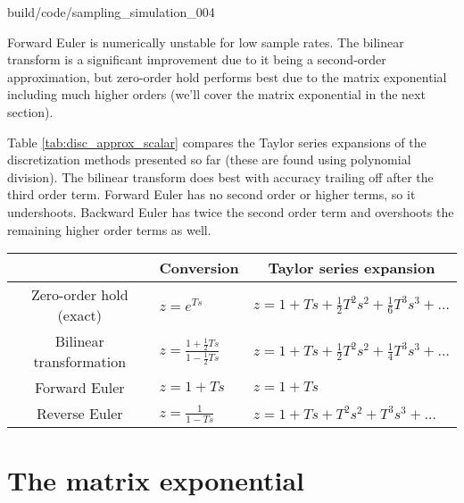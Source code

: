 \begin{svg}{build/code/sampling_simulation_004}
  \caption{Sampling methods for system simulation with $T = 0.04s$}
  \label{fig:sampling_simulation_0.04}
\end{svg}

Forward Euler is numerically unstable for low sample rates. The bilinear
transform is a significant improvement due to it being a second-order
approximation, but zero-order hold performs best due to the matrix exponential
including much higher orders (we'll cover the matrix exponential in the next
section).

Table \ref{tab:disc_approx_scalar} compares the Taylor series expansions of the
discretization methods presented so far (these are found using polynomial
division). The bilinear transform does best with accuracy trailing off after the
third order term. Forward Euler has no second order or higher terms, so it
undershoots. Backward Euler has twice the second order term and overshoots the
remaining higher order terms as well.

\begin{booktable}
  \begin{tabular}{|cll|}
    \hline
    \rowcolor{headingbg}
    \multicolumn{1}{|c}{\textbf{Discretization method}} &
      \multicolumn{1}{c}{\textbf{Conversion}} &
      \multicolumn{1}{c|}{\textbf{Taylor series expansion}} \\
    \hline
    Zero-order hold (exact) &
      $z = e^{Ts}$ &
      $z = 1 + Ts + \frac{1}{2}T^2s^2 + \frac{1}{6}T^3s^3 + \ldots$ \\
    Bilinear transformation &
      $z = \frac{1 + \frac{1}{2}Ts}{1 - \frac{1}{2}Ts}$ &
      $z = 1 + Ts + \frac{1}{2}T^2s^2 + \frac{1}{4}T^3s^3 + \ldots$ \\
    Forward Euler &
      $z = 1 + Ts$ &
      $z = 1 + Ts$ \\
    Reverse Euler &
      $z = \frac{1}{1 - Ts}$ &
      $z = 1 + Ts + T^2s^2 + T^3s^3 + \ldots$ \\
    \hline
  \end{tabular}
  \caption{Taylor series expansions of discretization methods (scalar case)}
  \label{tab:disc_approx_scalar}
\end{booktable}

\section{The matrix exponential}

